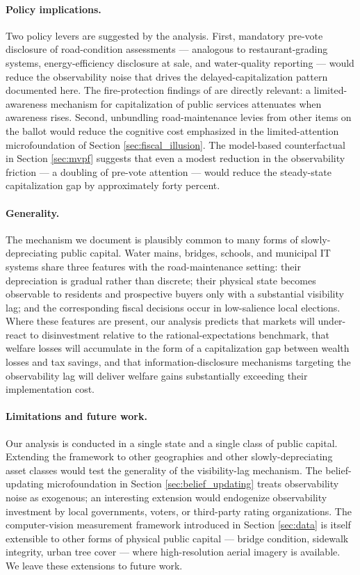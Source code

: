\paragraph{Policy implications.}
Two policy levers are suggested by the analysis. First, mandatory pre-vote disclosure of road-condition assessments --- analogous to restaurant-grading systems, energy-efficiency disclosure at sale, and water-quality reporting --- would reduce the observability noise that drives the delayed-capitalization pattern documented here. The fire-protection findings of \citet{brasington2024fire} are directly relevant: a limited-awareness mechanism for capitalization of public services attenuates when awareness rises. Second, unbundling road-maintenance levies from other items on the ballot would reduce the cognitive cost emphasized in the limited-attention microfoundation of Section \ref{sec:fiscal_illusion}. The model-based counterfactual in Section \ref{sec:mvpf} suggests that even a modest reduction in the observability friction --- a doubling of pre-vote attention --- would reduce the steady-state capitalization gap by approximately forty percent.

\paragraph{Generality.}
The mechanism we document is plausibly common to many forms of slowly-depreciating public capital. Water mains, bridges, schools, and municipal IT systems share three features with the road-maintenance setting: their depreciation is gradual rather than discrete; their physical state becomes observable to residents and prospective buyers only with a substantial visibility lag; and the corresponding fiscal decisions occur in low-salience local elections. Where these features are present, our analysis predicts that markets will under-react to disinvestment relative to the rational-expectations benchmark, that welfare losses will accumulate in the form of a capitalization gap between wealth losses and tax savings, and that information-disclosure mechanisms targeting the observability lag will deliver welfare gains substantially exceeding their implementation cost.

\paragraph{Limitations and future work.}
Our analysis is conducted in a single state and a single class of public capital. Extending the framework to other geographies and other slowly-depreciating asset classes would test the generality of the visibility-lag mechanism. The belief-updating microfoundation in Section \ref{sec:belief_updating} treats observability noise as exogenous; an interesting extension would endogenize observability investment by local governments, voters, or third-party rating organizations. The computer-vision measurement framework introduced in Section \ref{sec:data} is itself extensible to other forms of physical public capital --- bridge condition, sidewalk integrity, urban tree cover --- where high-resolution aerial imagery is available. We leave these extensions to future work.
